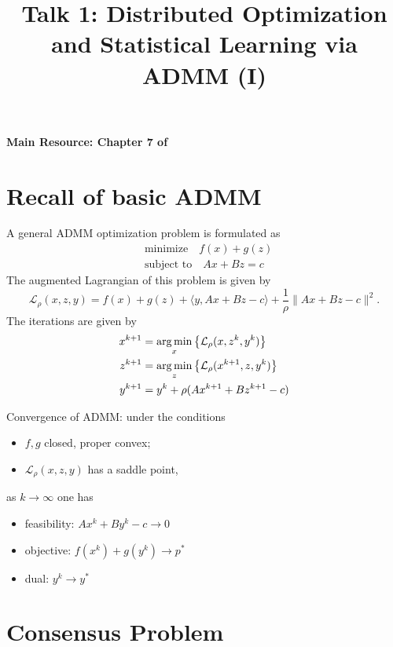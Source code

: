 
\usepackage{empheq}
\usepackage{cancel}



\title{Talk 1: Distributed Optimization and Statistical Learning via ADMM (I)}
\date{}
\author{}

\maketitle

{\bfseries Main Resource: Chapter 7 of \cite{boyd2011distributed}}

\section{Recall of basic ADMM}

A general ADMM optimization problem is formulated as
\begin{align*}
    & \text{minimize} \quad f(x) + g(z) \\
    & \text{subject to} \quad Ax + Bz = c
\end{align*}
The augmented Lagrangian of this problem is given by
$$\mathcal{L}_{\rho}(x,z,y) = f(x) + g(z) + \langle y, Ax+Bz-c \rangle + \dfrac{1}{\rho}\lVert Ax+Bz-c \rVert^2.$$
The iterations are given by
\begin{align*}
    x^{k+1} & = \operatorname*{arg\,min}_{x} \left\{ \mathcal{L}_{\rho}(x,z^k,y^k) \right\} \\
    z^{k+1} & = \operatorname*{arg\,min}_{z} \left\{ \mathcal{L}_{\rho}(x^{k+1},z,y^k) \right\} \\
    y^{k+1} & = y^{k} + \rho (Ax^{k+1}+Bz^{k+1}-c)
\end{align*}

Convergence of ADMM: under the conditions
\begin{itemize}
    \item $f,g$ closed, proper convex;
    \item $\mathcal{L}_{\rho}(x,z,y)$ has a saddle point,
\end{itemize}
as $k\rightarrow\infty$ one has
\begin{itemize}
    \item feasibility: $Ax^k + By^k - c \rightarrow 0$
    \item objective: $f(x^k) + g(y^k) \rightarrow p^*$
    \item dual: $y^k \rightarrow y^*$
\end{itemize}

\section{Consensus Problem}

